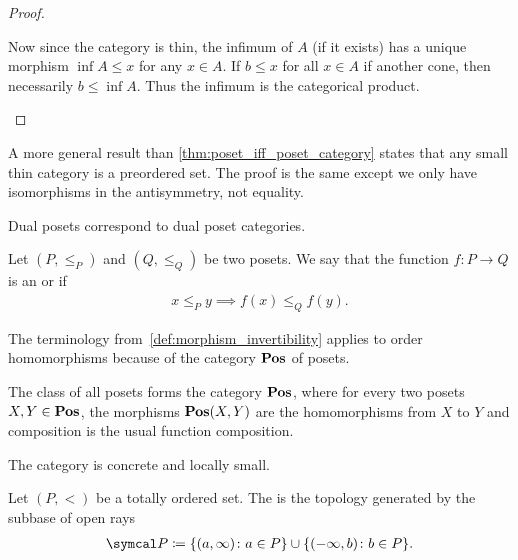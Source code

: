 \begin{proof}
\begin{description}
    Now since the category is thin, the infimum of $A$ (if it exists) has a unique morphism $\inf A \leq x$ for any $x \in A$. If $b \leq x$ for all $x \in A$ if another cone, then necessarily $b \leq \inf A$. Thus the infimum is the categorical product.
  \end{description}
\end{proof}

\begin{note}\label{note:small_thin_category_isomorphic_to_preorder}
  A more general result than \cref{thm:poset_iff_poset_category} states that any small thin category is a preordered set. The proof is the same except we only have isomorphisms in the antisymmetry, not equality.
\end{note}

\begin{proposition}\label{thm:dual_poset_dual_poset_category}
  Dual posets correspond to dual poset categories.
\end{proposition}

\begin{definition}\label{def:order_homomorphism}
  Let $(P, \leq_P)$ and $(Q, \leq_Q)$ be two posets. We say that the function $f: P \to Q$ is an  or  if
  \begin{align*}
    x \leq_P y \implies f(x) \leq_Q f(y).
  \end{align*}

  The terminology from~\cref{def:morphism_invertibility} applies to order homomorphisms because of the category $\operatorname{\mathbf{Pos}}$ of posets.
\end{definition}

\begin{definition}\label{def:category_of_posets}
  The class of all posets forms the category $\operatorname{\mathbf{Pos}}$, where for every two posets $X, Y \in \operatorname{\mathbf{Pos}}$, the morphisms $\operatorname{\mathbf{Pos}}(X, Y)$ are the homomorphisms from $X$ to $Y$ and composition is the usual function composition.

  The category is concrete and locally small.
\end{definition}

\begin{definition}\label{def:order_topology}\cite{nLab:order_topology}
  Let $(P, <)$ be a totally ordered set. The  is the topology generated by the subbase of open rays
  \begin{align*}
    \Cal{P} \coloneqq \{ (a, \infty) \colon a \in P \} \cup \{ (-\infty, b) \colon b \in P \}.
  \end{align*}
\end{definition}

